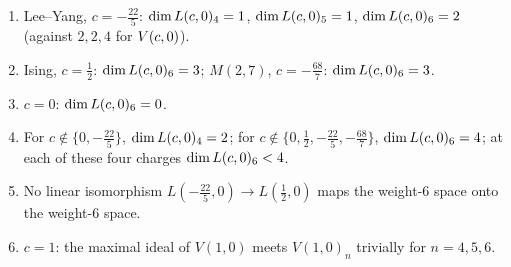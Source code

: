 \begin{theorem}\label{l06:thm:dims}
\begin{enumerate}
\item Lee--Yang, $c = -\frac{22}5$: $\dim L(c,0)_4 = 1$, $\dim L(c,0)_5 = 1$, $\dim L(c,0)_6 = 2$
  (against $2,2,4$ for $V(c,0)$).
\item Ising, $c = \frac12$: $\dim L(c,0)_6 = 3$; $M(2,7)$, $c = -\frac{68}7$: $\dim L(c,0)_6 = 3$.
\item $c = 0$: $\dim L(c,0)_6 = 0$.
\item For $c\notin\{0,-\frac{22}5\}$, $\dim L(c,0)_4 = 2$; for $c\notin\{0,\frac12,-\frac{22}5,-\frac{68}7\}$,
  $\dim L(c,0)_6 = 4$; at each of these four charges $\dim L(c,0)_6<4$.
\item No linear isomorphism $L(-\frac{22}5,0)\to L(\frac12,0)$ maps the weight-6 space onto the weight-6
  space.
\item $c = 1$: the maximal ideal of $V(1,0)$ meets $V(1,0)_n$ trivially for $n = 4,5,6$.
\end{enumerate}
\end{theorem}


